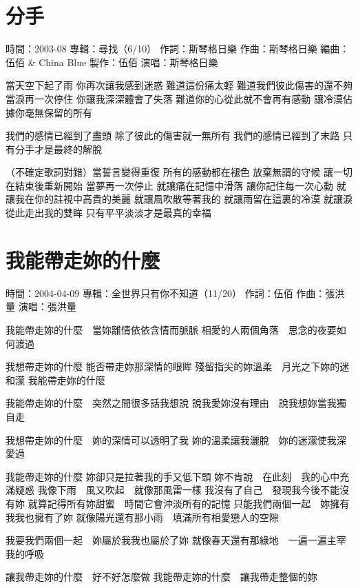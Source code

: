 \documentclass[UTF8,a4paper,oneside,twocolumn,12pt]{ctexbook}
\newcommand{\infopair}[2]{\textbullet #1：#2}
\newcommand{\zc}[1][伍佰]{\infopair{作詞}{#1}}
\newcommand{\zq}[1][伍佰]{\infopair{作曲}{#1}}
\newcommand{\bq}[1][伍佰]{\infopair{編曲}{#1}}
\newcommand{\zj}[1]{\infopair{專輯}{#1}}
\newcommand{\zz}[1]{\infopair{製作}{#1}}
\newcommand{\sj}[1]{\infopair{時間}{#1}}
\newenvironment{info}{\begin{flushleft}\kaishu
	}
	{\end{flushleft}\normalsize\yahei\par}
\newenvironment{lyric}{
	}
{}
\begin{document}
\section{分手}
\begin{info}
	\sj{2003-08}
	\zj{尋找（6/10）}
	\zc[斯琴格日樂]
	\zq[斯琴格日樂]
	\bq[伍佰 \& China Blue]
	\zz{伍佰}
	\infopair{演唱}{斯琴格日樂}
\end{info}
\begin{lyric}
	當天空下起了雨
	你再次讓我感到迷惑
	難道這份痛太輕
	難道我們彼此傷害的還不夠
	當淚再一次停住
	你讓我深深體會了失落
	難道你的心從此就不會再有感動
	讓冷漠佔據你毫無保留的所有

	我們的感情已經到了盡頭
	除了彼此的傷害就一無所有
	我們的感情已經到了末路
	只有分手才是最終的解脫

	（不確定歌詞對錯）當誓言變得重復
	所有的感動都在褪色
	放棄無謂的守候
	讓一切在結束後重新開始
	當夢再一次停止
	就讓痛在記憶中滑落
	讓你記住每一次心動
	就讓我在你的註視中高貴的美麗
	就讓風吹散等著我的
	就讓雨留在這裏的冷漠
	就讓淚從此走出我的雙眸
	只有平平淡淡才是最真的幸福
\end{lyric}

\section{我能帶走妳的什麼}
\begin{info}
	\sj{2004-04-09}
	\zj{全世界只有你不知道（11/20）}
	\zc[伍佰]
	\zq[張洪量]
	\infopair{演唱}{張洪量}
\end{info}
\begin{lyric}
	我能帶走妳的什麼　當妳離情依依含情而脈脈
	相愛的人兩個角落　思念的夜要如何渡過

	我想帶走妳的什麼
	能否帶走妳那深情的眼眸
	殘留指尖的妳溫柔　月光之下妳的迷和濛
	我能帶走妳的什麼

	我能帶走妳的什麼　突然之間很多話我想說
	說我愛妳沒有理由　說我想妳當我獨自走

	我想帶走妳的什麼　妳的深情可以透明了我
	妳的溫柔讓我灑脫　妳的迷濛使我深愛過

	我能帶走妳的什麼
	妳卻只是拉著我的手又低下頭
	妳不肯說　在此刻　我的心中充滿疑惑
	我像下雨　風又吹起　就像那風雷一樣
	我沒有了自己　發現我今後不能沒有妳
	就算記得所有妳甜蜜　時間它會沖淡所有的記憶
	只能我們兩個一起　妳擁有我我也擁有了妳
	就像陽光還有那小雨　填滿所有相愛戀人的空隙

	我要我們兩個一起　妳屬於我我也屬於了妳
	就像春天還有那綠地　一遍一遍主宰我的呼吸

	讓我帶走妳的什麼　好不好怎麼做
	我能帶走妳的什麼　讓我帶走整個的妳
\end{lyric}
\end{document}
